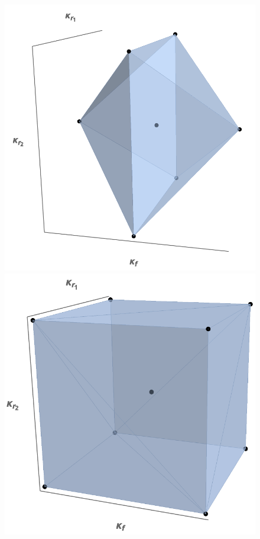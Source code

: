 \begin{figure}[t]
\centering
\includegraphics[scale=0.35]{mhous/plots/5pt_3D.png}
\includegraphics[scale=0.35]{mhous/plots/5barpt_3D.png}

\end{figure}
